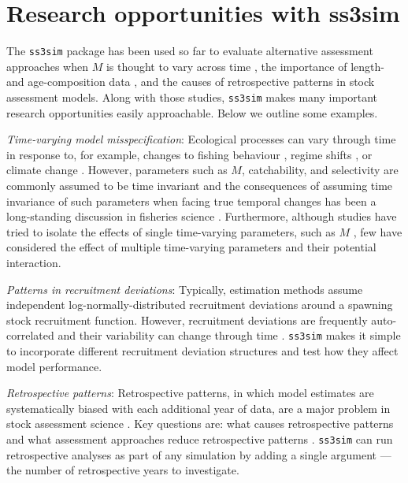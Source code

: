 \documentclass[11pt]{article}
\begin{document}
\section*{Research opportunities with ss3sim}

The \texttt{ss3sim} package has been used so far to evaluate alternative assessment approaches when $M$ is thought to vary across time \cite{johnson2013}, the importance of length- and age-composition data \cite{ono2013}, and the causes of retrospective patterns in stock assessment models. Along with those studies, \texttt{ss3sim} makes many important research opportunities easily approachable. Below we outline some examples.

\emph{Time-varying model misspecification}: Ecological processes can vary through time in response to, for example, changes to fishing behaviour \cite{hilborn1992}, regime shifts \cite{vert-pre2013}, or climate change \cite{walther2002}. However, parameters such as $M$, catchability, and selectivity are commonly assumed to be time invariant and the consequences of assuming time invariance of such parameters when facing true temporal changes has been a long-standing discussion in fisheries science \cite{royama1992, wilberg2006, fu2001}. Furthermore, although studies have tried to isolate the effects of single time-varying parameters, such as $M$ \cite{lee2011, jiao2012, deroba2013, johnson2013}, few have considered the effect of multiple time-varying parameters and their potential interaction.

\emph{Patterns in recruitment deviations}: Typically, estimation methods assume independent log-normally-distributed recruitment deviations around a spawning stock recruitment function. However, recruitment deviations are frequently auto-correlated and their variability can change through time \cite{beamish1995, pyper1998}. \texttt{ss3sim} makes it simple to incorporate different recruitment deviation structures and test how they affect model performance.

\emph{Retrospective patterns}: Retrospective patterns, in which model estimates are systematically biased with each additional year of data, are a major problem in stock assessment science \cite{mohn1999, legault2008}. Key questions are: what causes retrospective patterns and what assessment approaches reduce retrospective patterns \cite{legault2008}. \texttt{ss3sim} can run retrospective analyses as part of any simulation by adding a single argument --- the number of retrospective years to investigate.
\end{document}
